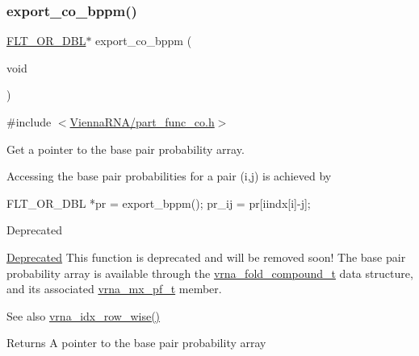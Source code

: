 \subsubsection{\texorpdfstring{export\+\_\+co\+\_\+bppm()}{export\_co\_bppm()}}
{\footnotesize\ttfamily \hyperlink{group__data__structures_ga31125aeace516926bf7f251f759b6126}{F\+L\+T\+\_\+\+O\+R\+\_\+\+D\+BL}$\ast$ export\+\_\+co\+\_\+bppm (\begin{DoxyParamCaption}\item[{void}]{ }\end{DoxyParamCaption})}



{\ttfamily \#include $<$\hyperlink{part__func__co_8h}{Vienna\+R\+N\+A/part\+\_\+func\+\_\+co.\+h}$>$}



Get a pointer to the base pair probability array. 

Accessing the base pair probabilities for a pair (i,j) is achieved by \begin{DoxyVerb}FLT_OR_DBL *pr = export_bppm(); pr_ij = pr[iindx[i]-j]; \end{DoxyVerb}


\begin{DoxyRefDesc}{Deprecated}
\item[\hyperlink{deprecated__deprecated000115}{Deprecated}]This function is deprecated and will be removed soon! The base pair probability array is available through the \hyperlink{group__fold__compound_ga1b0cef17fd40466cef5968eaeeff6166}{vrna\+\_\+fold\+\_\+compound\+\_\+t} data structure, and its associated \hyperlink{group__dp__matrices_ga68729ab3fed26bdd1806fa814f172fc1}{vrna\+\_\+mx\+\_\+pf\+\_\+t} member.\end{DoxyRefDesc}


\begin{DoxySeeAlso}{See also}
\hyperlink{group__utils_ga70b180e9ea764218a82647a1cd347445}{vrna\+\_\+idx\+\_\+row\+\_\+wise()} 
\end{DoxySeeAlso}
\begin{DoxyReturn}{Returns}
A pointer to the base pair probability array 
\end{DoxyReturn}
\mbox{\label{group__part__func__global__deprecated_gade3ce34ae8214811374b1d28a40dc247}} 
